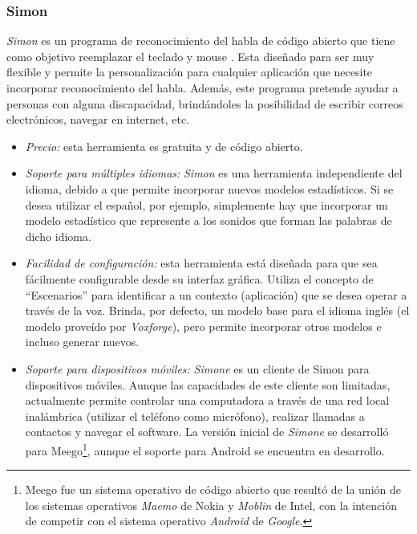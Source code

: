 \subsubsection{Simon}
\label{sec:simon}

\emph{Simon} es un programa de reconocimiento del habla de c\'odigo abierto que tiene como objetivo
reemplazar el teclado y mouse \cite{SimonListen}. Esta dise\~nado para ser muy flexible y permite la
personalizaci\'on para cualquier aplicaci\'on que necesite incorporar reconocimiento
del habla. Adem\'as, este programa pretende ayudar a personas con alguna discapacidad, brind\'andoles
la posibilidad de escribir correos electr\'onicos, navegar en internet, etc.

\begin{itemize}
    \item \emph{Precio:} esta herramienta es gratuita y de c\'odigo abierto.
    \item \emph{Soporte para m\'ultiples idiomas:} \emph{Simon} es una herramienta independiente del 
    idioma, debido a que permite incorporar nuevos modelos estad\'isticos. Si se desea
    utilizar el espa\~nol, por ejemplo, simplemente hay que incorporar un modelo estad\'istico 
    que represente a los sonidos que forman las palabras de dicho idioma.
    \item \emph{Facilidad de configuraci\'on:} esta herramienta est\'a dise\~nada para que sea
    f\'acilmente configurable desde su interfaz gr\'afica. Utiliza el concepto de ``Escenarios'' para
    identificar a un contexto (aplicaci\'on) que se desea operar a trav\'es de la voz. 
    Brinda, por defecto, un modelo base para el idioma ingl\'es (el modelo prove\'ido por 
    \emph{Voxforge}\cite{Voxforge}), pero permite incorporar otros modelos e incluso generar nuevos.
    \item \emph{Soporte para dispositivos m\'oviles:} \emph{Simone} es un cliente de Simon para 
    dispositivos m\'oviles. Aunque las capacidades de este cliente son limitadas, actualmente permite 
    controlar una computadora a trav\'es de una red local inal\'ambrica (utilizar el tel\'efono como 
    micr\'ofono), realizar llamadas a contactos y navegar el software. 
    La versi\'on inicial de \emph{Simone} se desarroll\'o para 
    Meego\footnote{Meego fue un sistema operativo de c\'odigo abierto que result\'o de la uni\'on de
    los sistemas operativos \emph{Maemo} de Nokia y \emph{Moblin} de Intel, con la intenci\'on de competir
    con el sistema operativo \emph{Android} de \emph{Google}.}, aunque el soporte para Android se encuentra en desarrollo.

\end{itemize}

